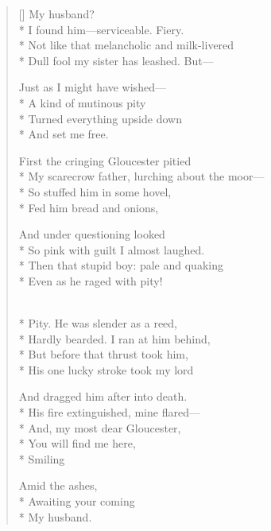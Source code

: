 \label{ch:lear_ao}
\settowidth{\versewidth}{My scarecrow father, lurching about the moor---}
\begin{verse}[\versewidth]
My husband?\\*
I found him---serviceable. Fiery.\\*
Not like that melancholic and milk-livered\\*
Dull fool my sister has leashed. But---

Just as I might have wished---\\*
A kind of mutinous pity\\*
Turned everything upside down\\*
And set me free.

First the cringing Gloucester pitied\\*
My scarecrow father, lurching about the moor---\\*
So stuffed him in some hovel,\\*
Fed him bread and onions,

And under questioning looked\\*
So pink with guilt I almost laughed.\\*
Then that stupid boy: pale and quaking\\*
Even as he raged with pity!

\\*
Pity.  He was slender as a reed,\\*
Hardly bearded. I ran at him behind,\\*
But before that thrust took him,\\*
His one lucky stroke took my lord

And dragged him after into death.\\*
His fire extinguished, mine flared---\\*
And, my most dear Gloucester,\\*
You will find me here,\\*
\qquad \qquad \qquad Smiling

Amid the ashes,\\*
\qquad \qquad Awaiting your coming\\*
My husband.
\end{verse}
